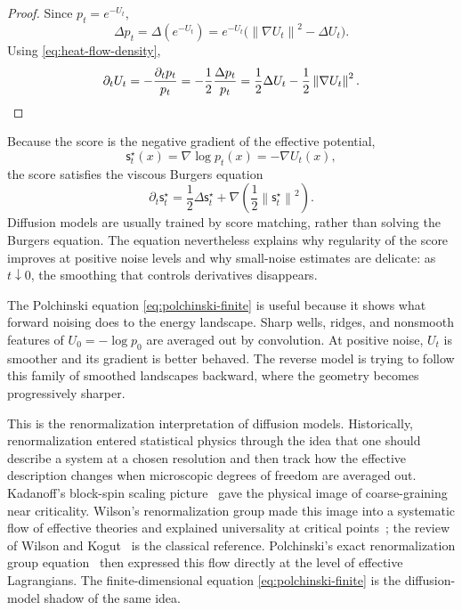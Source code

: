 \documentclass[10pt,a4paper]{amsart}
\numberwithin{equation}{section}
\newcommand{\norm}[1]{\left\lVert #1 \right\rVert}
\newcommand{\sstar}{\mathsf{s}^{\star}}
\begin{document}
\begin{proof}
Since $p_t=e^{-U_t}$,
\[
    \Delta p_t
    =
    \Delta(e^{-U_t})
    =
    e^{-U_t}\bigl(\norm{\nabla U_t}^2-\Delta U_t\bigr).
\]
Using \eqref{eq:heat-flow-density},
\begin{equation*}
    \partial_t U_t
    =
    -\frac{\partial_t p_t}{p_t}
    =
    -\frac12\frac{\Delta p_t}{p_t}
    =
    \frac12\Delta U_t-\frac12\norm{\nabla U_t}^2. \qedhere
\end{equation*}
\end{proof}

Because the score is the negative gradient of the effective potential,
\[
    \sstar_t(x)=\nabla\log p_t(x)=-\nabla U_t(x),
\]
the score satisfies the viscous Burgers equation
\begin{equation}\label{eq:burgers-score}
    \partial_t \sstar_t
    =
    \frac12\Delta \sstar_t
    +
    \nabla\left(\frac12\norm{\sstar_t}^2\right).
\end{equation}
Diffusion models are usually trained by score matching, rather than solving the Burgers equation.  The equation
nevertheless explains why regularity of the score improves at positive noise
levels and why small-noise estimates are delicate: as $t\downarrow0$, the
smoothing that controls derivatives disappears.

The Polchinski equation \eqref{eq:polchinski-finite} is useful because it shows what forward noising does to the energy landscape.  Sharp
wells, ridges, and nonsmooth features of $U_0=-\log p_0$ are averaged out by
convolution.  At positive noise, $U_t$ is smoother and its gradient is better
behaved.  The reverse model is trying to follow this family of smoothed
landscapes backward, where the geometry becomes progressively sharper.

This is the renormalization interpretation of diffusion models.  Historically,
renormalization entered statistical physics through the idea that one should
describe a system at a chosen resolution and then track how the effective
description changes when microscopic degrees of freedom are averaged out.
Kadanoff's block-spin
scaling picture~\cite{kadanoff1966scaling} gave the physical image of
coarse-graining near criticality.  Wilson's renormalization group made this
image into a systematic flow of effective theories and explained universality
at critical points~\cite{wilson1971rg1,wilson1971rg2}; the review of
Wilson and Kogut~\cite{wilson1974renormalization} is the classical reference.
Polchinski's exact renormalization group equation~\cite{polchinski1984renormalization}
then expressed this flow directly at the level of effective Lagrangians.  The
finite-dimensional equation \eqref{eq:polchinski-finite} is the diffusion-model
shadow of the same idea.
\end{document}
